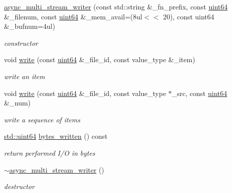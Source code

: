 \begin{DoxyCompactItemize}
\item 
\hyperlink{classasync__multi__stream__writer_a7f94653dac5ce376bea3b330942b59b3}{async\+\_\+multi\+\_\+stream\+\_\+writer} (const std\+::string \&\+\_\+fn\+\_\+prefix, const \hyperlink{types_8h_a60e8696a4678cd348e991a1f172e53f7}{uint64} \&\+\_\+filenum, const \hyperlink{types_8h_a60e8696a4678cd348e991a1f172e53f7}{uint64} \&\+\_\+mem\+\_\+avail=(8ul$<$$<$ 20), const uint64 \&\+\_\+bufnum=4ul)
\begin{DoxyCompactList}\small\item\em constructor \end{DoxyCompactList}\item 
void \hyperlink{classasync__multi__stream__writer_a0290b2d5fdf0368559eee905c09863e7}{write} (const \hyperlink{types_8h_a60e8696a4678cd348e991a1f172e53f7}{uint64} \&\+\_\+file\+\_\+id, const value\+\_\+type \&\+\_\+item)
\begin{DoxyCompactList}\small\item\em write an item \end{DoxyCompactList}\item 
void \hyperlink{classasync__multi__stream__writer_af44e02f6c2eac01f1022b51105ea9cc0}{write} (const \hyperlink{types_8h_a60e8696a4678cd348e991a1f172e53f7}{uint64} \&\+\_\+file\+\_\+id, const value\+\_\+type $\ast$\+\_\+src, const \hyperlink{types_8h_a60e8696a4678cd348e991a1f172e53f7}{uint64} \&\+\_\+num)
\begin{DoxyCompactList}\small\item\em write a sequence of items \end{DoxyCompactList}\item 
\hyperlink{types_8h_a60e8696a4678cd348e991a1f172e53f7}{std\+::uint64} \hyperlink{classasync__multi__stream__writer_a196cb6d52ef0d06c585f9e6bba4384b5}{bytes\+\_\+written} () const
\begin{DoxyCompactList}\small\item\em return performed I/O in bytes \end{DoxyCompactList}\item 
\hyperlink{classasync__multi__stream__writer_a26ace952cb25e9ec4a0839d0aafc5e5e}{$\sim$async\+\_\+multi\+\_\+stream\+\_\+writer} ()
\begin{DoxyCompactList}\small\item\em destructor \end{DoxyCompactList}\end{DoxyCompactItemize}
